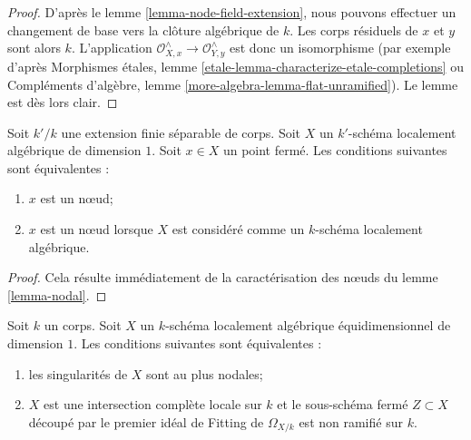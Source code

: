 \begin{proof}
D'après le lemme \ref{lemma-node-field-extension}, nous pouvons effectuer un changement de base vers la clôture algébrique de $k$. Les corps résiduels de $x$ et $y$ sont alors $k$. L'application $\mathcal{O}_{X, x}^\wedge \to \mathcal{O}_{Y, y}^\wedge$ est donc un isomorphisme (par exemple d'après Morphismes étales, lemme \ref{etale-lemma-characterize-etale-completions} ou Compléments d'algèbre, lemme \ref{more-algebra-lemma-flat-unramified}). Le lemme est dès lors clair.
\end{proof}

\begin{lemma}
\label{lemma-node-over-separable-extension}
Soit $k'/k$ une extension finie séparable de corps. Soit $X$ un $k'$-schéma localement algébrique de dimension $1$. Soit $x \in X$ un point fermé. Les conditions suivantes sont équivalentes : \begin{enumerate} \item $x$ est un nœud; \item $x$ est un nœud lorsque $X$ est considéré comme un $k$-schéma localement algébrique.
\end{enumerate}
\end{lemma}

\begin{proof}
Cela résulte immédiatement de la caractérisation des nœuds du lemme \ref{lemma-nodal}.
\end{proof}

\begin{lemma}
\label{lemma-nodal-lci}
Soit $k$ un corps. Soit $X$ un $k$-schéma localement algébrique équidimensionnel de dimension $1$. Les conditions suivantes sont équivalentes : \begin{enumerate} \item les singularités de $X$ sont au plus nodales; \item $X$ est une intersection complète locale sur $k$ et le sous-schéma fermé $Z \subset X$ découpé par le premier idéal de Fitting de $\Omega_{X/k}$ est non ramifié sur $k$.
\end{enumerate}
\end{lemma}

